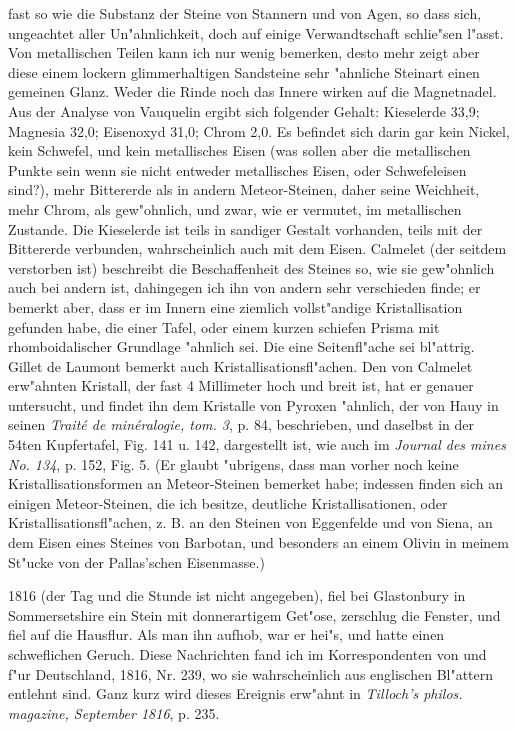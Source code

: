 \documentclass[a4paper, 11pt, oneside, polutonikogreek, german]{article}
\begin{document}
fast so wie die Substanz der Steine von Stannern und von Agen, so dass sich, ungeachtet aller Un"ahnlichkeit, doch auf einige Verwandtschaft schlie"sen l"asst. Von metallischen Teilen kann ich nur wenig bemerken, desto mehr zeigt aber diese einem lockern glimmerhaltigen Sandsteine sehr "ahnliche Steinart einen gemeinen Glanz. Weder die Rinde noch das Innere wirken auf die Magnetnadel. Aus der Analyse von Vauquelin ergibt sich folgender Gehalt: Kieselerde 33,9; Magnesia 32,0; Eisenoxyd 31,0; Chrom 2,0. Es befindet sich darin gar kein Nickel, kein Schwefel, und kein metallisches Eisen (was sollen aber die metallischen Punkte sein wenn sie nicht entweder metallisches Eisen, oder Schwefeleisen sind?), mehr Bittererde als in andern Meteor-Steinen, daher seine Weichheit, mehr Chrom, als gew"ohnlich, und zwar, wie er vermutet, im metallischen Zustande. Die Kieselerde ist teils in sandiger Gestalt vorhanden, teils mit der Bittererde verbunden, wahrscheinlich auch mit dem Eisen. Calmelet (der seitdem verstorben ist) beschreibt die Beschaffenheit des Steines so, wie sie gew"ohnlich auch bei andern ist, dahingegen ich ihn von andern sehr verschieden finde; er bemerkt aber, dass er im Innern eine ziemlich vollst"andige Kristallisation gefunden habe, die einer Tafel, oder einem kurzen schiefen Prisma mit rhomboidalischer Grundlage "ahnlich sei. Die eine Seitenfl"ache sei bl"attrig. Gillet de Laumont bemerkt auch Kristallisationsfl"achen. Den von Calmelet erw"ahnten Kristall, der fast 4 Millimeter hoch und breit ist, hat er genauer untersucht, und findet ihn dem Kristalle von Pyroxen "ahnlich, der von Hauy in seinen \emph{Traité de minéralogie, tom. 3}, p. 84, beschrieben, und daselbst in der 54ten Kupfertafel, Fig. 141 u. 142, dargestellt ist, wie auch im \emph{Journal des mines No. 134}, p. 152, Fig. 5. (Er glaubt "ubrigens, dass man vorher noch keine Kristallisationsformen an Meteor-Steinen bemerket habe; indessen finden sich an einigen Meteor-Steinen, die ich besitze, deutliche Kristallisationen, oder Kristallisationsfl"achen, z. B. an den Steinen von Eggenfelde und von Siena, an dem Eisen eines Steines von Barbotan, und besonders an einem Olivin in meinem St"ucke von der Pallas'schen Eisenmasse.)

1816 (der Tag und die Stunde ist nicht angegeben), fiel bei Glastonbury in Sommersetshire ein Stein mit donnerartigem Get"ose, zerschlug die Fenster, und fiel auf die Hausflur. Als man ihn aufhob, war er hei"s, und hatte einen schweflichen Geruch. Diese Nachrichten fand ich im Korrespondenten von und f"ur Deutschland, 1816, Nr. 239, wo sie wahrscheinlich aus englischen Bl"attern entlehnt sind. Ganz kurz wird dieses Ereignis erw"ahnt in \emph{Tilloch's philos. magazine, September 1816}, p. 235.
\end{document}
